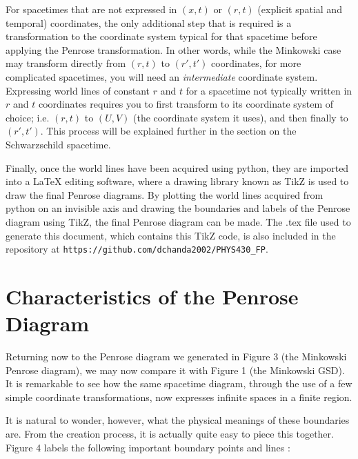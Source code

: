 \documentclass{article}
\begin{document}
For spacetimes that are not expressed in $(x,t)$ or $(r,t)$ (explicit spatial and temporal) coordinates, the only additional step that is required is a transformation to the coordinate system typical for that spacetime before applying the Penrose transformation. In other words, while the Minkowski case may transform directly from $(r,t)$ to $(r',t')$ coordinates, for more complicated spacetimes, you will need an \textit{intermediate} coordinate system. Expressing world lines of constant $r$ and $t$ for a spacetime not typically written in $r$ and $t$ coordinates requires you to first transform to its coordinate system of choice; i.e. $(r,t)$ to $(U,V)$ (the coordinate system it uses), and then finally to $(r',t')$. This process will be explained further in the section on the Schwarzschild spacetime.

Finally, once the world lines have been acquired using python, they are imported into a LaTeX editing software, where a drawing library known as TikZ is used to draw the final Penrose diagrams. By plotting the world lines acquired from python on an invisible axis and drawing the boundaries and labels of the Penrose diagram using TikZ, the final Penrose diagram can be made. The .tex file used to generate this document, which contains this TikZ code, is also included in the repository at \texttt{https://github.com/dchanda2002/PHYS430_FP}.

\section{Characteristics of the Penrose Diagram}

Returning now to the Penrose diagram we generated in Figure 3 (the Minkowski Penrose diagram), we may now compare it with Figure 1 (the Minkowski GSD). It is remarkable to see how the same spacetime diagram, through the use of a few simple coordinate transformations, now expresses infinite spaces in a finite region.

It is natural to wonder, however, what the physical meanings of these boundaries are. From the creation process, it is actually quite easy to piece this together. Figure 4 labels the following important boundary points and lines 
\cite{minkowski_penrose_desc}:
\end{document}
